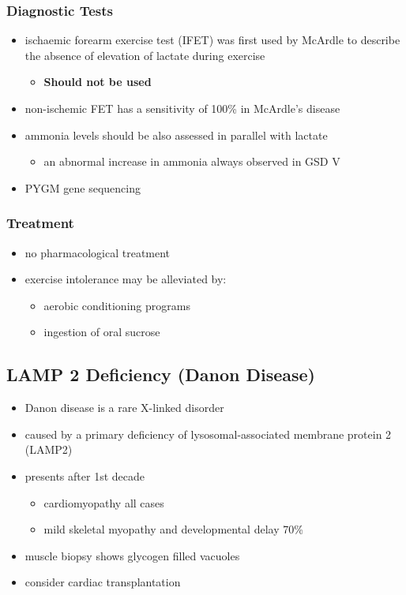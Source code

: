 \documentclass{scrartcl}
\begin{document}
\subsubsection{Diagnostic Tests}
\label{sec:org222d295}
\begin{itemize}
\item ischaemic forearm exercise test (IFET) was first used by McArdle to
describe the absence of elevation of lactate during exercise
\begin{itemize}
\item \textbf{Should not be used}
\end{itemize}
\item non-ischemic FET has a sensitivity of 100\% in McArdle’s disease
\item ammonia levels should be also assessed in parallel with lactate
\begin{itemize}
\item an abnormal increase in ammonia always observed in GSD V
\end{itemize}
\item PYGM gene sequencing
\end{itemize}

\subsubsection{Treatment}
\label{sec:orgad98466}
\begin{itemize}
\item no pharmacological treatment
\item exercise intolerance may be alleviated by:
\begin{itemize}
\item aerobic conditioning programs
\item ingestion of oral sucrose
\end{itemize}
\end{itemize}
\subsection{LAMP 2 Deficiency (Danon Disease)}
\label{sec:org8366b31}
\begin{itemize}
\item Danon disease is a rare X-linked disorder
\item caused by a primary deficiency of lysosomal-associated membrane
protein 2 (LAMP2)
\item presents after 1st decade
\begin{itemize}
\item cardiomyopathy all cases
\item mild skeletal myopathy and developmental delay 70\%
\end{itemize}
\item muscle biopsy shows glycogen filled vacuoles
\item consider cardiac transplantation
\end{itemize}
\end{document}
